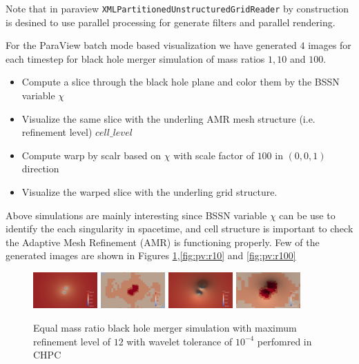 Note that in paraview \texttt{XMLPartitionedUnstructuredGridReader} by construction is desined to use parallel processing for generate filters and parallel rendering. 


For the ParaView batch mode based visualization we have generated $4$ images for each timestep for black hole merger simulation of mass ratios $1,10$ and $100$. 
\begin{itemize}
    \item Compute a slice through the black hole plane and color them by the BSSN variable $\chi$
    \item Visualize the same slice with the underling AMR mesh structure (i.e. refinement level) $cell\_level$    
    \item Compute warp by scalr based on $\chi$ with scale factor of $100$ in $(0,0,1)$ direction
    \item Visualize the warped slice with the underling grid structure. 
\end{itemize}

Above simulations are mainly interesting since BSSN variable $\chi$ can be use to identify the each singularity in spacetime, and cell structure is important to check the Adaptive Mesh Refinement (AMR) is functioning properly. Few of the generated
images are shown in Figures \ref{fig:pv:r1},\ref{fig:pv:r10} and \ref{fig:pv:r100} 

\begin{figure}[H]
    \centering
    \includegraphics[width=0.22\textwidth]{figs/paraview/r1/img_slice_000200.png}
    \includegraphics[width=0.22\textwidth]{figs/paraview/r1/img_slice_level_000200.png}
    \includegraphics[width=0.22\textwidth]{figs/paraview/r1/img_slice_wbs_000200.png}
    \includegraphics[width=0.22\textwidth]{figs/paraview/r1/img_slice_level_wbs_000200.png}
    \caption{Equal mass ratio black hole merger simulation with maximum refinement level of $12$ with wavelet tolerance of $10^{-4}$ perfomred in CHPC \label{fig:pv:r1}}
\end{figure}


